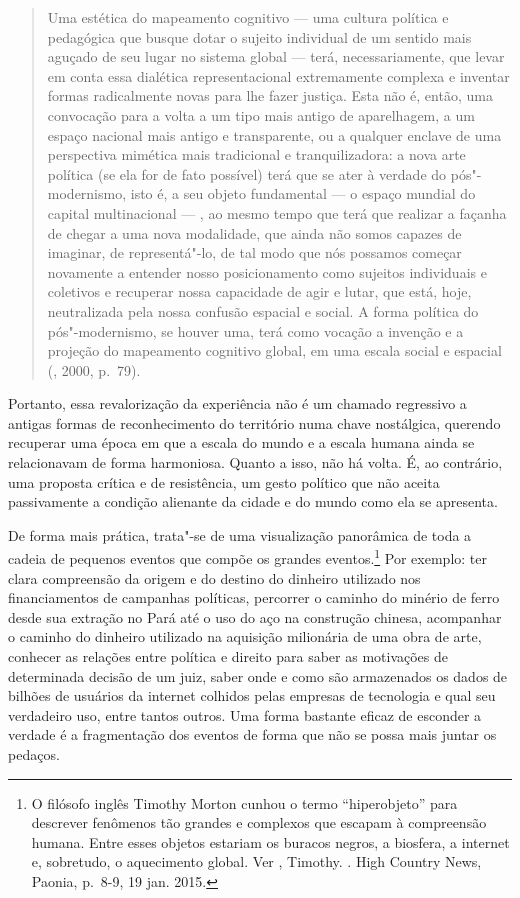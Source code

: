 \begin{quote}
Uma estética do mapeamento cognitivo --- uma cultura política e
pedagógica que busque dotar o sujeito individual de um sentido mais
aguçado de seu lugar no sistema global --- terá, necessariamente, que
levar em conta essa dialética representacional extremamente complexa e
inventar formas radicalmente novas para lhe fazer justiça. Esta não é,
então, uma convocação para a volta a um tipo mais antigo de aparelhagem,
a um espaço nacional mais antigo e transparente, ou a qualquer enclave
de uma perspectiva mimética mais tradicional e tranquilizadora: a nova
arte política (se ela for de fato possível) terá que se ater à verdade
do pós"-modernismo, isto é, a seu objeto fundamental --- o espaço mundial
do capital multinacional --- , ao mesmo tempo que terá que realizar a
façanha de chegar a uma nova modalidade, que ainda não somos capazes de
imaginar, de representá"-lo, de tal modo que nós possamos começar
novamente a entender nosso posicionamento como sujeitos individuais e
coletivos e recuperar nossa capacidade de agir e lutar, que está, hoje,
neutralizada pela nossa confusão espacial e social. A forma política do
pós"-modernismo, se houver uma, terá como vocação a invenção e a projeção
do mapeamento cognitivo global, em uma escala social e espacial
(, 2000, p.~79).
\end{quote}

Portanto, essa revalorização da experiência não é um chamado regressivo
a antigas formas de reconhecimento do território numa chave nostálgica,
querendo recuperar uma época em que a escala do mundo e a escala humana
ainda se relacionavam de forma harmoniosa. Quanto a isso, não há volta.
É, ao contrário, uma proposta crítica e de resistência, um gesto
político que não aceita passivamente a condição alienante da cidade e do
mundo como ela se apresenta.

De forma mais prática, trata"-se de uma visualização panorâmica de toda a cadeia de pequenos eventos que compõe os grandes eventos.\footnote{O filósofo inglês Timothy Morton cunhou o termo ``hiperobjeto'' para descrever fenômenos tão grandes e complexos que escapam à compreensão humana. Entre esses objetos estariam os buracos negros, a biosfera, a internet e, sobretudo, o aquecimento global. Ver , Timothy. {}. High Country News, Paonia, p.~8-9, 19 jan. 2015.} Por exemplo: ter clara compreensão da origem e do destino do dinheiro utilizado nos financiamentos de campanhas políticas, percorrer o caminho do minério de ferro desde sua extração no Pará até o uso do aço na construção chinesa, acompanhar o caminho do dinheiro utilizado na aquisição milionária de uma obra de arte, conhecer as relações entre política e direito para saber as motivações de determinada decisão de um juiz, saber onde e como são armazenados os dados de bilhões de usuários da internet colhidos pelas empresas de tecnologia e qual seu verdadeiro uso, entre tantos outros. Uma forma bastante eficaz de esconder a verdade é a fragmentação dos eventos de forma que não se possa mais juntar os pedaços.

